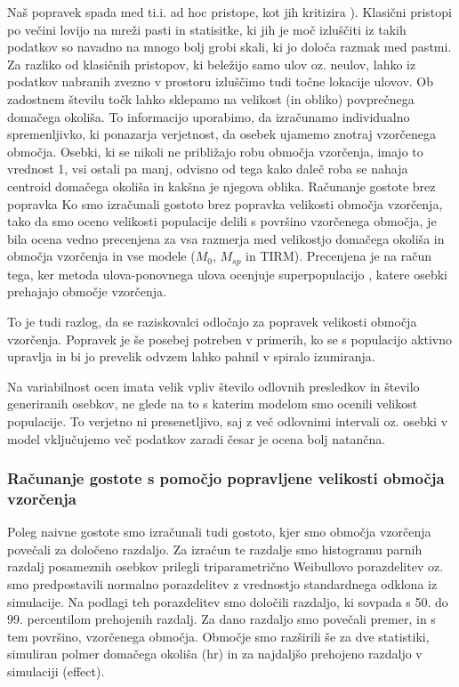 Naš popravek spada med ti.i. ad hoc pristope, kot jih kritizira \citep{royle_spatial_2013}). Klasični pristopi po večini lovijo na mreži pasti in statisitke, ki jih je moč izluščiti iz takih podatkov so navadno na mnogo bolj grobi skali, ki jo določa razmak med pastmi. Za razliko od klasičnih pristopov, ki beležijo samo ulov oz. neulov, lahko iz podatkov nabranih zvezno v prostoru izluščimo tudi točne lokacije ulovov. Ob zadostnem številu točk lahko sklepamo na velikost (in obliko) povprečnega domačega okoliša. To informacijo uporabimo, da izračunamo individualno spremenljivko, ki ponazarja verjetnost, da osebek ujamemo znotraj vzorčenega območja. Osebki, ki se nikoli ne približajo robu območja vzorčenja, imajo to vrednost 1, vsi ostali pa manj, odvisno od tega kako daleč roba se nahaja centroid domačega okoliša in kakšna je njegova oblika.
Računanje gostote brez popravka
Ko smo izračunali gostoto brez popravka velikosti območja vzorčenja, tako da smo oceno velikosti populacije delili s površino vzorčenega območja, je bila ocena vedno precenjena za vsa razmerja med velikostjo domačega okoliša in območja vzorčenja in vse modele ($M_0$, $M_{sp}$ in TIRM). Precenjena je na račun tega, ker metoda ulova-ponovnega ulova ocenjuje superpopulacijo \citep{white_capture-recapture_1982}, katere osebki prehajajo območje vzorčenja.

To je tudi razlog, da se raziskovalci odločajo za popravek velikosti območja vzorčenja. Popravek je še posebej potreben v primerih, ko se s populacijo aktivno upravlja in bi jo prevelik odvzem lahko pahnil v spiralo izumiranja.

Na variabilnost ocen imata velik vpliv število odlovnih presledkov in število generiranih osebkov, ne glede na to s katerim modelom smo ocenili velikost populacije. To verjetno ni presenetljivo, saj z več odlovnimi intervali oz. osebki v model vključujemo več podatkov zaradi česar je ocena bolj natančna.

\subsubsection{Računanje gostote s pomočjo popravljene velikosti območja vzorčenja}
Poleg naivne gostote smo izračunali tudi gostoto, kjer smo območja vzorčenja povečali za določeno razdaljo. Za izračun te razdalje smo histogramu parnih razdalj posameznih osebkov prilegli triparametrično Weibullovo porazdelitev oz. smo predpostavili normalno porazdelitev z vrednostjo standardnega odklona iz simulacije. Na podlagi teh porazdelitev smo določili razdaljo, ki sovpada s 50. do 99. percentilom prehojenih razdalj. Za dano razdaljo smo povečali premer, in s tem površino, vzorčenega območja. Območje smo razširili še za dve statistiki, simuliran polmer domačega okoliša (hr) in za najdaljšo prehojeno razdaljo v simulaciji (effect).

